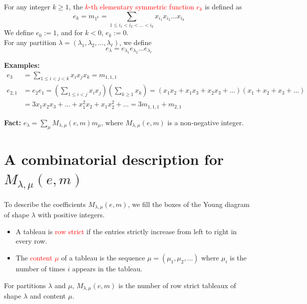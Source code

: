 \documentclass[12pt]{memoir}
\begin{document}
\begin{ptcb}
\begin{Def}
For any integer $k \ge 1$, the \textcolor{red}{$k$-th elementary symmetric function $e_k$} is defined as
\[
e_k = m_{1^k} = \sum_{1 \le i_1 < i_2 < \dots < i_k} x_{i_1} x_{i_2} \dots x_{i_k}
\]
We define $e_0 := 1$, and for $k < 0$, $e_k := 0$.\\
For any partition $\lambda = (\lambda_1, \lambda_2, \dots, \lambda_\ell)$, we define
\[
e_\lambda = e_{\lambda_1} e_{\lambda_2} \dots e_{\lambda_\ell}
\]
\end{Def}
\end{ptcb}

\textcolor{verdeUCR}{\textbf{Examples:}}
\begin{align*}
    e_3 &= \sum_{1 \le i < j < k} x_i x_j x_k = m_{1,1,1}\\[0.5em]
    e_{2,1} &= e_2 e_1 = \left( \sum_{1 \le i < j} x_i x_j \right) \left( \sum_{k \ge 1} x_k \right) = (x_1 x_2 + x_1 x_3 + x_2 x_3 + \dots)(x_1 + x_2 + x_3 + \dots)\\
    &= 3 x_1 x_2 x_3 + \dots + x_1^2 x_2 + x_1 x_2^2 + \dots = 3 m_{1,1,1} + m_{2,1}
\end{align*}

\textbf{Fact:} $e_\lambda = \sum_\mu M_{\lambda,\mu}(e,m) m_\mu$, where $M_{\lambda,\mu}(e,m)$ is a non-negative integer.

\newpage

\section{A combinatorial description for \texorpdfstring{$M_{\lambda,\mu}(e,m)$}{M\_\{lambda,mu\}(e,m)}}

To describe the coefficients $M_{\lambda,\mu}(e,m)$, we fill the boxes of the Young diagram of shape $\lambda$ with positive integers.

\begin{itemize}[label=$\diamond$]
    \item A tableau is \textcolor{red}{row strict} if the entries strictly increase from left to right in every row.
    \item The \textcolor{red}{content $\mu$} of a tableau is the sequence $\mu = (\mu_1, \mu_2, \dots)$ where $\mu_i$ is the number of times $i$ appears in the tableau.
\end{itemize}

\begin{ptcb}
\begin{Prop}
For partitions $\lambda$ and $\mu$, $M_{\lambda,\mu}(e,m)$ is the number of row strict tableaux of shape $\lambda$ and content $\mu$.
\end{Prop}
\end{ptcb}
\end{document}
